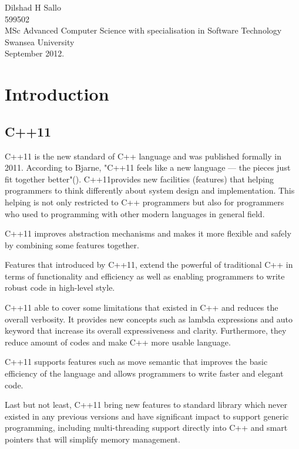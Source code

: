 \documentclass[11pt]{report}
\begin{document}
\begin{flushright}
Dilshad H Sallo\\
599502\\
MSc Advanced Computer Science with specialisation in Software Technology\\
Swansea University\\
September 2012.
\end{flushright}

\tableofcontents


\chapter{Introduction}
\label{cha:intro}


\section{C++11}
\label{sec: C++11}
C++11 is the new standard of C++ language and was published formally in 2011.  According to Bjarne, "C++11 feels like a new language — the pieces just fit together better"(\cite{Stroustrup:2012:Cpp11}). C++11provides new facilities (features) that helping programmers to think differently about system design and implementation. This helping is not only restricted to C++ programmers but also for programmers who used to programming with other modern languages in general field. 

C++11 improves abstraction mechanisms and makes it more flexible and safely by combining some features together.

Features that introduced by C++11, extend the powerful of traditional C++ in terms of functionality and efficiency as well as enabling programmers to write robust code in high-level style.

C++11 able to cover some limitations that existed in C++ and reduces the overall verbosity. It provides new concepts such as lambda expressions and auto keyword that increase its overall expressiveness and clarity. Furthermore, they reduce amount of codes and make C++ more usable language.

C++11 supports features such as move semantic that improves the basic efficiency of the language and allows programmers to write faster and elegant code. 

Last but not least, C++11 bring new features to standard library which never existed in any previous versions and have significant impact to support generic programming, including multi-threading support directly into C++ and smart pointers that will simplify memory management.
\end{document}

